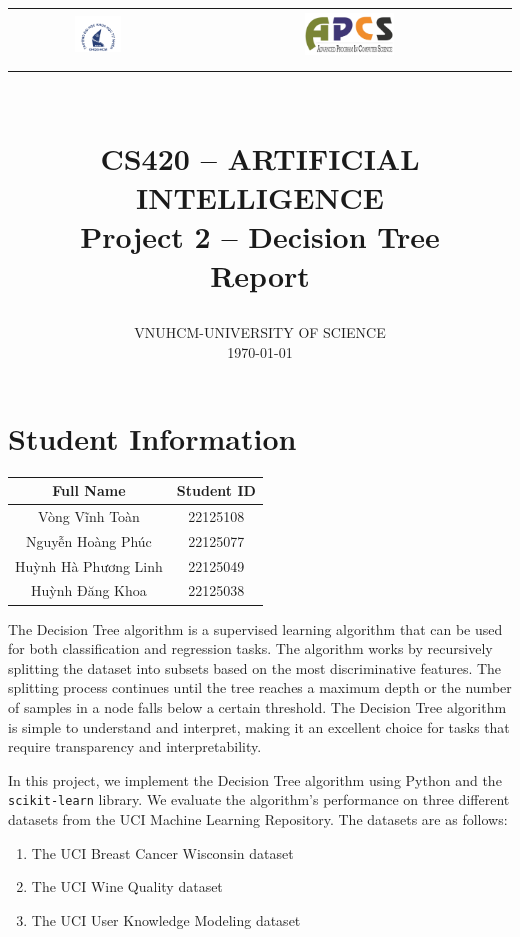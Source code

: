 \documentclass{article}
\title{ \normalsize \textsc{}
		\\ [2.0cm]
        \begin{tabular}{c@{\hskip 2cm}c}
            \includegraphics[width=0.3\textwidth]{styles/logoHCMUS.png}
            &
            \includegraphics[width=0.3\textwidth]{styles/logoAPCS.png}
        \end{tabular}
        \vspace{2em} \\
        \vspace{6pt}
        \LARGE \textbf{\uppercase{CS420 -- Artificial Intelligence}} \\
		\LARGE \textbf{Project 2 -- Decision Tree} \\
        \Large \textbf{Report} \\
        \vspace*{13\baselineskip}
}
\author{
    VNUHCM-UNIVERSITY OF SCIENCE \\
    \today
}
\date{}
\begin{document}
\maketitle
\thispagestyle{empty}
\newpage

\thispagestyle{empty}
\section*{Student Information}
\begin{table}[h]
    \centering
    \begin{tabular}{|c|c|}
        \hline
        \textbf{Full Name} & \textbf{Student ID} \\ \hline 
        Vòng Vĩnh Toàn & 22125108 \\ \hline
        Nguyễn Hoàng Phúc & 22125077\\ \hline
        Huỳnh Hà Phương Linh & 22125049\\ \hline
        Huỳnh Đăng Khoa & 22125038 \\ 
        \hline
    \end{tabular}
\end{table}
\newpage

\tableofcontents
\thispagestyle{empty}
\newpage

\setcounter{page}{1}

The Decision Tree algorithm is a supervised learning algorithm that can be used for both classification and regression tasks. The algorithm works by recursively splitting the dataset into subsets based on the most discriminative features. The splitting process continues until the tree reaches a maximum depth or the number of samples in a node falls below a certain threshold. The Decision Tree algorithm is simple to understand and interpret, making it an excellent choice for tasks that require transparency and interpretability.

In this project, we implement the Decision Tree algorithm using Python and the \texttt{scikit-learn} library. We evaluate the algorithm's performance on three different datasets from the UCI Machine Learning Repository. The datasets are as follows:
\begin{enumerate}
    \item The UCI Breast Cancer Wisconsin dataset \cite{breast_cancer_wisconsin}
    \item The UCI Wine Quality dataset \cite{wine_quality}
    \item The UCI User Knowledge Modeling dataset \cite{user_knowledge_modeling}
\end{enumerate}
\end{document}

